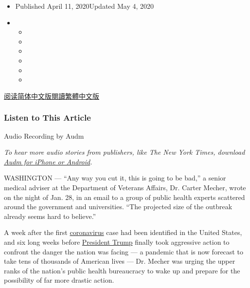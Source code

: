 \begin{itemize}
\item
  Published April 11, 2020Updated May 4, 2020
\item
  \begin{itemize}
  \item
  \item
  \item
  \item
  \item
  \item
  \end{itemize}
\end{itemize}

\href{https://cn.nytimes3xbfgragh.onion/usa/20200413/coronavirus-trump-response/}{阅读简体中文版}\href{https://cn.nytimes3xbfgragh.onion/usa/20200413/coronavirus-trump-response/zh-hant/}{閱讀繁體中文版}

\hypertarget{listen-to-this-article}{%
\subsubsection{Listen to This Article}\label{listen-to-this-article}}

Audio Recording by Audm

\emph{To hear more audio stories from publishers, like The New York
Times, download}
\href{https://www.audm.com/?utm_source=nyt\&utm_medium=embed\&utm_campaign=trumps_failure_virus}{\emph{Audm
for iPhone or Android}}\emph{.}

WASHINGTON --- ``Any way you cut it, this is going to be bad,'' a senior
medical adviser at the Department of Veterans Affairs, Dr. Carter
Mecher, wrote on the night of Jan. 28, in an email to a group of public
health experts scattered around the government and universities. ``The
projected size of the outbreak already seems hard to believe.''

A week after the first
\href{https://www.nytimes3xbfgragh.onion/2020/05/04/us/politics/trump-coronavirus-death-toll.html}{coronavirus}
case had been identified in the United States, and six long weeks before
\href{https://www.nytimes3xbfgragh.onion/2020/05/04/us/politics/trump-coronavirus-death-toll.html}{President
Trump} finally took aggressive action to confront the danger the nation
was facing --- a pandemic that is now forecast to take tens of thousands
of American lives --- Dr. Mecher was urging the upper ranks of the
nation's public health bureaucracy to wake up and prepare for the
possibility of far more drastic action.

